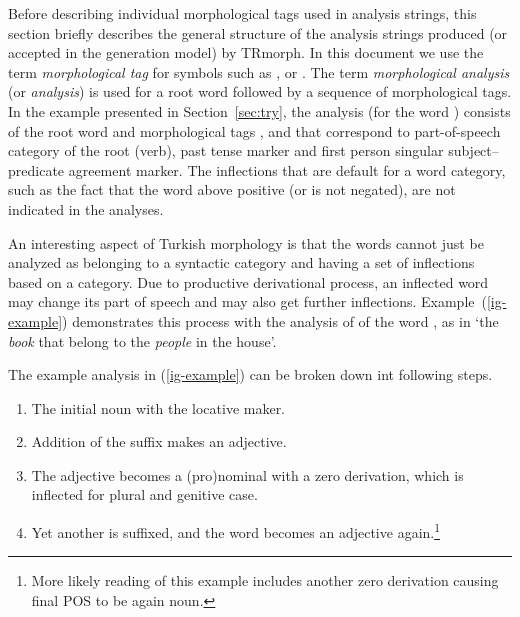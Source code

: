 \documentclass[twocolumn]{article}
\begin{document}
Before describing individual morphological tags used in analysis strings, 
this section briefly describes the general structure of the analysis strings
produced (or accepted in the generation model) by TRmorph.
In this document we use the term \emph{morphological tag} for symbols such as , or .
The term \emph{morphological analysis} (or \emph{analysis}) is used for a root word followed by a sequence of morphological tags. 
In the example presented in Section~\ref{sec:try}, 
the analysis  (for the word ) consists of the root word  
and morphological tags ,  and  
that correspond to part-of-speech category of the root (verb), past tense marker
and first person singular subject--predicate agreement marker.
The inflections that are default for a word category, 
such as the fact that the word above positive (or is not negated), 
are not indicated in the analyses.

An interesting aspect of Turkish morphology is that 
the words cannot just be analyzed as belonging to a syntactic category and having a set of inflections based on a category.
Due to productive derivational process, 
an inflected word may change its part of speech and may also get further inflections.
Example~(\ref{ig-example}) demonstrates this process with the analysis of of the word , as in `the \emph{book} that belong to the \emph{people} in the house'.


The example analysis in (\ref{ig-example}) can be broken down int following steps.

\begin{enumerate}
\item The initial noun  with the locative maker.
\item Addition of the suffix  makes an adjective.
\item The adjective becomes a (pro)nominal with a zero derivation,
which is inflected for plural and genitive case.
\item Yet another  is suffixed, and the word becomes an
adjective again.\footnote{More likely reading of this example
includes another zero derivation causing final POS to be again noun.}
\end{enumerate}
\end{document}
